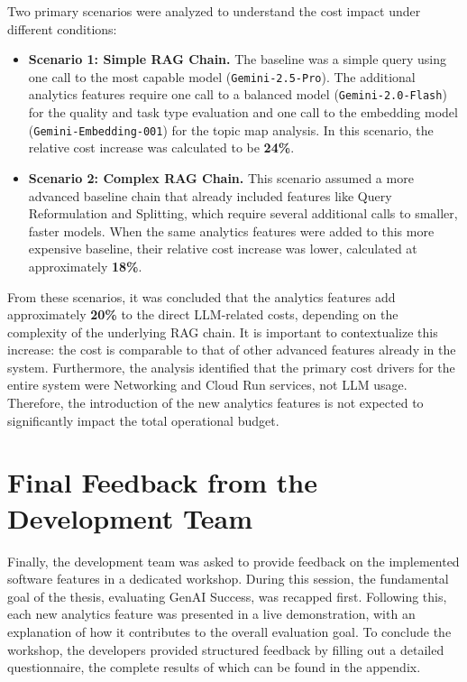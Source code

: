 \documentclass[
	english,
	ruledheaders=section,%
	class=report,%
	thesis={type=bachelor},%
	accentcolor=1b,%
	custommargins=true,%
	marginpar=false,%
	parskip=half-,%
	fontsize=11pt,%
	DIV=14,
]{tudapub}
\begin{document}
Two primary scenarios were analyzed to understand the cost impact under different conditions:

\begin{itemize}
    \item \textbf{Scenario 1: Simple RAG Chain.} The baseline was a simple query using one call to the most capable model (\texttt{Gemini-2.5-Pro}). The additional analytics features require one call to a balanced model (\texttt{Gemini-2.0-Flash}) for the quality and task type evaluation and one call to the embedding model (\texttt{Gemini-Embedding-001}) for the topic map analysis. In this scenario, the relative cost increase was calculated to be \textbf{24\%}.

    \item \textbf{Scenario 2: Complex RAG Chain.} This scenario assumed a more advanced baseline chain that already included features like Query Reformulation and Splitting, which require several additional calls to smaller, faster models. When the same analytics features were added to this more expensive baseline, their relative cost increase was lower, calculated at approximately \textbf{18\%}.
\end{itemize}

From these scenarios, it was concluded that the analytics features add approximately \textbf{20\%} to the direct LLM-related costs, depending on the complexity of the underlying RAG chain. It is important to contextualize this increase: the cost is comparable to that of other advanced features already in the system. Furthermore, the analysis identified that the primary cost drivers for the entire system were Networking and Cloud Run services, not LLM usage. Therefore, the introduction of the new analytics features is not expected to significantly impact the total operational budget.

\section{Final Feedback from the Development Team}
Finally, the development team was asked to provide feedback on the implemented software features in a dedicated workshop. During this session, the fundamental goal of the thesis, evaluating GenAI Success, was recapped first. Following this, each new analytics feature was presented in a live demonstration, with an explanation of how it contributes to the overall evaluation goal. To conclude the workshop, the developers provided structured feedback by filling out a detailed questionnaire, the complete results of which can be found in the appendix.
\end{document}
